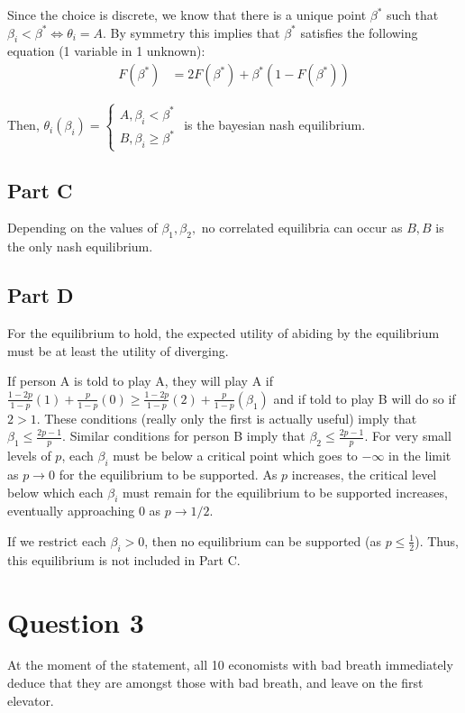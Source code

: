 \documentclass[11pt]{article} %
\begin{document}
Since the choice is discrete, we know that there is a unique point $\beta^{*}$ such that $\beta_i<\beta^{*}\iff\theta_i = A$. By symmetry this implies that $\beta^{*}$ satisfies the following equation (1 variable in 1 unknown):
\begin{align*}
F(\beta^{*})&=2F(\beta^{*}) + \beta^{*}(1-F(\beta^{*}))
\end{align*}

Then, $\theta_i(\beta_i) = \begin{cases} A, \beta_i<\beta^{*} \\ B, \beta_i\geq\beta^{*} \end{cases}$ is the bayesian nash equilibrium.
\subsection{Part C}
Depending on the values of $\beta_1,\beta_2,$ no correlated equilibria can occur as $B,B$ is the only nash equilibrium. %
\subsection{Part D}
For the equilibrium to hold, the expected utility of abiding by the equilibrium must be at least the utility of diverging.

If person  A is told to play A, they will play A if $\frac{1-2p}{1-p}(1) + \frac{p}{1-p}(0)\geq \frac{1-2p}{1-p}(2) + \frac{p}{1-p}(\beta_1)$ and if told to play B will do so if $2>1$. These conditions (really only the first is actually useful) imply that $\beta_1 \leq \frac{2p-1}{p}$. Similar conditions for person B imply that $\beta_2 \leq \frac{2p-1}{p}$. For very small levels of $p$, each $\beta_i$ must be below a critical point which goes to $-\infty$ in the limit as $p\rightarrow 0$ for the equilibrium to be supported. As $p$ increases, the critical level below which each $\beta_i$ must  remain for the equilibrium to be supported increases, eventually approaching $0$ as $p\rightarrow 1/2$.

If we restrict each $\beta_i>0$, then no equilibrium can be supported (as $p\leq\frac{1}{2}$). Thus, this equilibrium is not included in Part C.
\section{Question 3}
At the moment of the statement, all 10 economists with bad breath immediately deduce that they are amongst those with bad breath, and leave on the first elevator.
\end{document}
